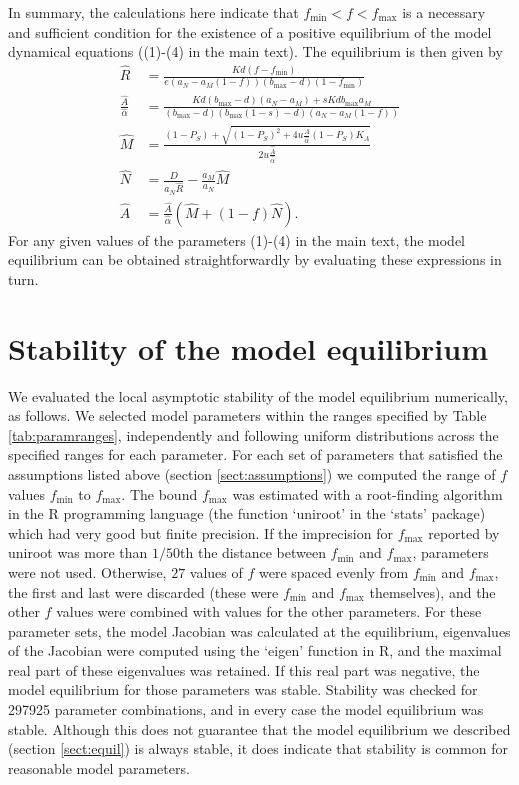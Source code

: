 \documentclass[letterpaper,11pt]{article}
\newcommand{\hA}{\hat{A}}
\newcommand{\hR}{\hat{R}}
\newcommand{\hM}{\hat{M}}
\newcommand{\hN}{\hat{N}}
\newcommand{\halph}{\hat{\alpha}}
\newcommand{\bmax}{b_{\text{max}}}
\newcommand{\fmin}{f_{\text{min}}}
\newcommand{\fmax}{f_{\text{max}}}
\begin{document}
In summary, the calculations here indicate that $\fmin<f<\fmax$ is a necessary and sufficient condition
for the existence of a positive equilibrium of the model dynamical equations ((1)-(4) in the main text).
The equilibrium is then given by
\begin{align}
\hR &= \frac{Kd(f-\fmin)}{e(a_N-a_M(1-f))(\bmax-d)(1-\fmin)} \\
\frac{\hA}{\halph} &= \frac{Kd(\bmax-d)(a_N-a_M)+sKd\bmax a_M}{(\bmax-d)(\bmax(1-s)-d)(a_N-a_M(1-f))} \\
\hM &= \frac{(1-P_S) + \sqrt{(1-P_S)^2+4u\frac{\hA}{\halph}(1-P_S)K_A}}{2u\frac{\hA}{\halph}} \\
\hN &= \frac{D}{a_N \hR}-\frac{a_M}{a_N}\hM \\
\hA &= \frac{\hA}{\halph}(\hM+(1-f)\hN).
\end{align}
For any given values of the parameters (1)-(4) in the main text, the model equilibrium can be obtained
straightforwardly by evaluating these expressions in turn.

\section{Stability of the model equilibrium}\label{sect:stability}

\noindent We evaluated the local asymptotic stability of the model equilibrium numerically, as follows. 
We selected model parameters within the ranges specified by Table \ref{tab:paramranges}, independently
and following uniform distributions across the specified ranges for each parameter. For each set of parameters that 
satisfied the assumptions listed above (section \ref{sect:assumptions}) we computed the range of
$f$ values $\fmin$ to $\fmax$. The bound $\fmax$ was estimated with a root-finding algorithm in
the R programming language (the function `uniroot' in the `stats' package) which had very good but finite 
precision. If the imprecision for $\fmax$ reported by uniroot was more than $1/50$th the distance 
between $\fmin$ and $\fmax$, parameters were not used. Otherwise, $27$ values of $f$ were spaced 
evenly from $\fmin$ and $\fmax$, the first and last were discarded (these were $\fmin$ and $\fmax$
themselves), and the other $f$ values were combined with values for the other parameters. For these parameter sets, 
the model Jacobian was calculated at the equilibrium, eigenvalues of the Jacobian were
computed using the `eigen' function in R, and the maximal real part of these eigenvalues was retained. 
If this real part was negative, the model equilibrium for those parameters was stable. Stability was checked
for 297925 parameter combinations, and in every case the model equilibrium was stable. Although this does not 
guarantee that the model equilibrium we described (section \ref{sect:equil}) is always stable, it does 
indicate that stability is common for reasonable model parameters.
\end{document}
